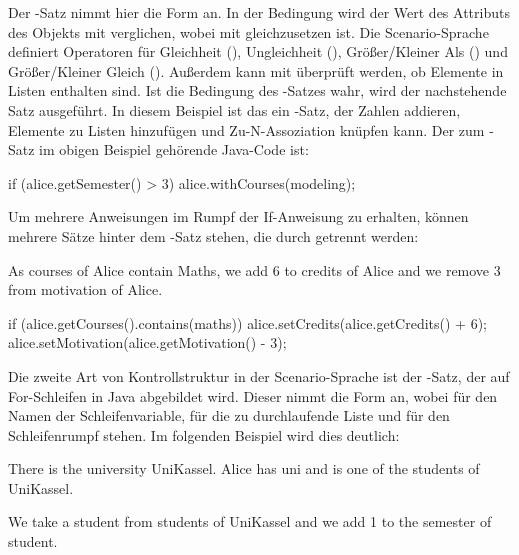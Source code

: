 Der -Satz nimmt hier die Form  an.
In der Bedingung wird der Wert des Attributs  des Objekts  mit  verglichen, wobei  mit \code{>} gleichzusetzen ist.
Die Scenario-Sprache definiert Operatoren für Gleichheit (), Ungleichheit (), Größer/Kleiner Als () und Größer/Kleiner Gleich ().
Außerdem kann mit  überprüft werden, ob Elemente in Listen enthalten sind.
Ist die Bedingung des -Satzes wahr, wird der nachstehende Satz ausgeführt.
In diesem Beispiel ist das ein -Satz, der Zahlen addieren, Elemente zu Listen hinzufügen und Zu-N-Assoziation knüpfen kann.
Der zum -Satz im obigen Beispiel gehörende Java-Code ist:

\begin{jcodeblock}
    if (alice.getSemester() > 3) {
        alice.withCourses(modeling);
    }
\end{jcodeblock}

Um mehrere Anweisungen im Rumpf der If-Anweisung zu erhalten, können mehrere Sätze hinter dem -Satz stehen, die durch  getrennt werden:

\begin{codeblock}
    As courses of Alice contain Maths, we add 6 to credits of Alice
    and we remove 3 from motivation of Alice.
\end{codeblock}

\begin{jcodeblock}
    if (alice.getCourses().contains(maths)) {
        alice.setCredits(alice.getCredits() + 6);
        alice.setMotivation(alice.getMotivation() - 3);
    }
\end{jcodeblock}

Die zweite Art von Kontrollstruktur in der Scenario-Sprache ist der -Satz, der auf For-Schleifen in Java abgebildet wird.
Dieser nimmt die Form  an, wobei  für den Namen der Schleifenvariable,  für die zu durchlaufende Liste und  für den Schleifenrumpf stehen.
Im folgenden Beispiel wird dies deutlich:

\begin{codeblock}
    There is the university UniKassel.
    Alice has uni and is one of the students of UniKassel.

    We take a student from students of UniKassel and we add 1 to the semester of student.
\end{codeblock}

